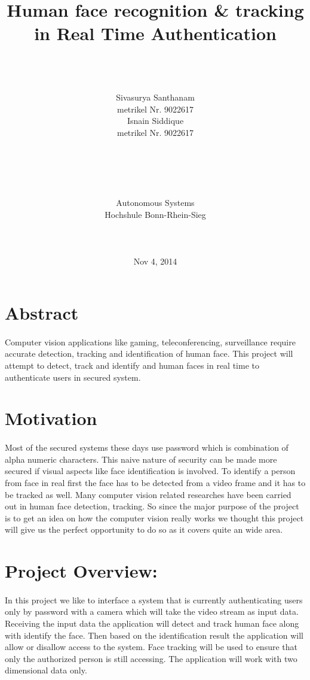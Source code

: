 \documentclass[11pt]{article}
\title{\textbf{Human face recognition \& tracking in Real Time Authentication}}
\author{\\ \\ \\ Sivasurya Santhanam\\
		metrikel Nr. 9022617 \\
		Isnain Siddique\\
		metrikel Nr. 9022617
		\\ \\ 	\\ \\ 	\\ \\
		Autonomous Systems \\ 
		Hochshule Bonn-Rhein-Sieg \\ \\
		\\ 
		\\
		Nov 4, 2014
		}
\date{}
\begin{document}
\maketitle



\newpage
\section*{Abstract}
\paragraph*{} Computer vision applications like gaming, teleconferencing, surveillance require accurate detection, tracking and identification of human face. This project will attempt to detect, track and identify and human faces in real time to authenticate users in secured system. \\

\section*{Motivation}
\paragraph*{} Most of the secured systems these days use password which is combination of alpha numeric characters. This naive nature of security can be made more secured if visual aspects like face identification is involved.
To identify a person from face in real first the face has to be detected from a video frame and it has to be tracked as well. Many computer vision related researches have been carried out in human face detection, tracking. So since the major purpose of the project is to get an idea on how the computer vision really works we thought this project will give us the perfect opportunity to do so as it covers quite an wide area.


\section*{Project Overview:}
\paragraph*{} In this project we like to interface a system that is currently authenticating users only by password with a camera which will take the video stream as input data. Receiving the input data the application will detect and track human face along with identify the face. Then based on the identification result the application will allow or disallow access to the system. Face tracking will be used to ensure that only the authorized person is still accessing. The application will work with two dimensional data only. \\
\end{document}
